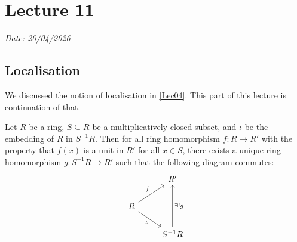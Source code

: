 \chapter{Lecture 11}

\hfill {\footnotesize \textit{Date: 20/04/2026}}

\section{Localisation}
We discussed the notion of localisation in \autoref{Lec04}. This part of this lecture is continuation of that.

\begin{theorem}
    Let \( R \) be a ring, \( S \subseteq R \) be a multiplicatively closed subset, and \( \iota \) be the embedding of  \( R \) in \( S^{-1}R \). Then for all ring homomorphism \( f: R \to R' \) with the property that  \( f(x) \) is a unit in  \( R' \) for all  \( x \in S \), there exists a unique ring homomorphism  \( g : S^{-1}R \to R' \) such that the following diagram commutes:
\[\begin{tikzcd}
	& R' \\
	R \\
	{} & {S^{-1}R}
	\arrow["f", from=2-1, to=1-2]
	\arrow["\iota"', from=2-1, to=3-2]
	\arrow["{\exists!g}"', from=3-2, to=1-2]
\end{tikzcd}\]
    \end{theorem}
